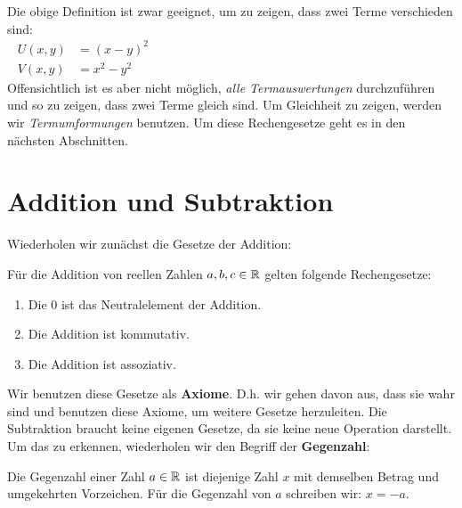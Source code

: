 \documentclass[11pt,oneside]{article}
\begin{document}
    Die obige Definition ist zwar geeignet, um zu zeigen, dass zwei Terme verschieden sind:
    \begin{align*}
    	U(x,y) &= (x-y)^{2} \hspace{10cm} \\[0.5cm]
    	V(x,y) &= x^{2} - y^{2}
    \end{align*}
    Offensichtlich ist es aber nicht möglich, \emph{alle Termauswertungen} durchzuführen und so zu zeigen, dass zwei Terme gleich sind. Um Gleichheit zu zeigen, werden wir \emph{Termumformungen} benutzen. Um diese Rechengesetze geht es in den nächsten Abschnitten.
    \newpage


\section{Addition und Subtraktion}
    Wiederholen wir zunächst die Gesetze der Addition:
    \begin{satz}
    	Für die Addition von reellen Zahlen $a,b,c\in\mathbb{R}$ gelten folgende Rechengesetze:
    	\begin{enumerate}
    	   \item Die $0$ ist das Neutralelement der Addition.
    	   \item Die Addition ist kommutativ.
    	   \item Die Addition ist assoziativ.
    	\end{enumerate}
    \end{satz}
    Wir benutzen diese Gesetze als \textbf{Axiome}. D.h. wir gehen davon aus, dass sie wahr sind und benutzen diese Axiome, um weitere Gesetze herzuleiten. Die Subtraktion braucht keine eigenen Gesetze, da sie keine neue Operation darstellt. Um das zu erkennen, wiederholen wir den Begriff der \textbf{Gegenzahl}:
    \begin{definition}
    	Die Gegenzahl einer Zahl $a\in\mathbb{R}$ ist diejenige Zahl $x$ mit demselben Betrag und umgekehrten Vorzeichen.\newline
    	Für die Gegenzahl von $a$ schreiben wir: $x=-a$.
    \end{definition}
\end{document}
